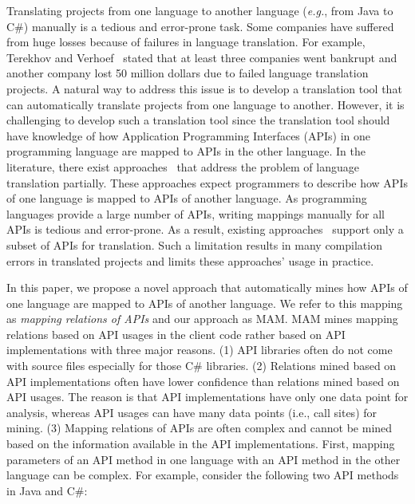 Translating projects from one language to another language
(\emph{e.g.}, from Java to C\#) manually is a tedious and
error-prone task. Some companies have suffered from huge losses because
of failures in language translation. For example, Terekhov and
Verhoef~\cite{terekhov2000realities} stated that at least three
companies went bankrupt and another company lost 50 million dollars
due to failed language translation projects. A natural way to
address this issue is to develop a translation tool that can
automatically translate projects from one language to another.
However, it is challenging to develop such a translation tool since the
translation tool should have knowledge of how Application
Programming Interfaces (APIs) in one programming
language are mapped to APIs in the other language. In the literature, there exist
approaches~\cite{mossienko2003automated, yasumatsu1995spice,
hainaut2008migration} that address the problem of language
translation partially. These approaches expect programmers to
describe how APIs of one language is mapped to APIs of another
language.  As programming languages provide a large number of APIs,
writing mappings manually for all APIs is tedious and error-prone.
As a result, existing approaches~\cite{mossienko2003automated,yasumatsu1995spice,hainaut2008migration}
support only a subset of APIs for translation. Such a limitation
results in many compilation errors in translated projects and limits
these approaches' usage in practice.

In this paper, we propose a novel approach that automatically mines
how APIs of one language are mapped to APIs of another language. We
refer to this mapping as \emph{mapping relations of APIs} and our
approach as MAM. MAM mines mapping relations based on API usages in
the client code rather based on API implementations with three major
reasons. (1) API libraries often do not come with source files
especially for those C\# libraries. (2) Relations mined based on API
implementations often have lower confidence than relations mined
based on API usages. The reason is that API implementations have
only one data point for analysis, whereas API usages can have many
data points (i.e., call sites) for mining. (3) Mapping relations of
APIs are often complex and cannot be mined based on the information
available in the API implementations. First, mapping parameters of
an API method in one language with an API method in the other
language can be complex. For example, consider the following two API
methods in Java and C\#:

